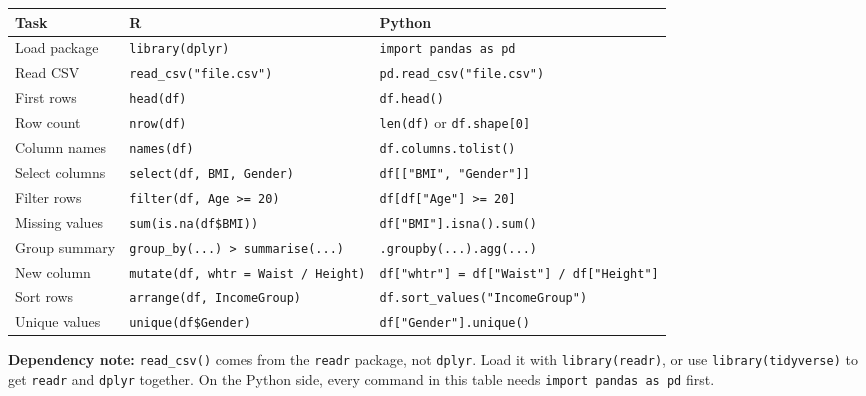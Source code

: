 \documentclass[
  letterpaper,
  DIV=11,
  numbers=noendperiod,
  oneside]{scrreprt}
\begin{document}
\begin{longtable}[]{@{}
  >{\raggedright\arraybackslash}p{}
  >{\raggedright\arraybackslash}p{}
  >{\raggedright\arraybackslash}p{}@{}}
\toprule\noalign{}
\begin{minipage}[b]{\linewidth}\raggedright
Task
\end{minipage} & \begin{minipage}[b]{\linewidth}\raggedright
R
\end{minipage} & \begin{minipage}[b]{\linewidth}\raggedright
Python
\end{minipage} \\
\midrule\noalign{}
\endhead
\bottomrule\noalign{}
\endlastfoot
Load package & \texttt{library(dplyr)} &
\texttt{import\ pandas\ as\ pd} \\
Read CSV & \texttt{read\_csv("file.csv")} &
\texttt{pd.read\_csv("file.csv")} \\
First rows & \texttt{head(df)} & \texttt{df.head()} \\
Row count & \texttt{nrow(df)} & \texttt{len(df)} or
\texttt{df.shape{[}0{]}} \\
Column names & \texttt{names(df)} & \texttt{df.columns.tolist()} \\
Select columns & \texttt{select(df,\ BMI,\ Gender)} &
\texttt{df{[}{[}"BMI",\ "Gender"{]}{]}} \\
Filter rows & \texttt{filter(df,\ Age\ \textgreater{}=\ 20)} &
\texttt{df{[}df{[}"Age"{]}\ \textgreater{}=\ 20{]}} \\
Missing values & \texttt{sum(is.na(df\$BMI))} &
\texttt{df{[}"BMI"{]}.isna().sum()} \\
Group summary &
\texttt{group\_by(...)\ \textbar{}\textgreater{}\ summarise(...)} &
\texttt{.groupby(...).agg(...)} \\
New column & \texttt{mutate(df,\ whtr\ =\ Waist\ /\ Height)} &
\texttt{df{[}"whtr"{]}\ =\ df{[}"Waist"{]}\ /\ df{[}"Height"{]}} \\
Sort rows & \texttt{arrange(df,\ IncomeGroup)} &
\texttt{df.sort\_values("IncomeGroup")} \\
Unique values & \texttt{unique(df\$Gender)} &
\texttt{df{[}"Gender"{]}.unique()} \\
\end{longtable}

\textbf{Dependency note:} \texttt{read\_csv()} comes from the
\texttt{readr} package, not \texttt{dplyr}. Load it with
\texttt{library(readr)}, or use \texttt{library(tidyverse)} to get
\texttt{readr} and \texttt{dplyr} together. On the Python side, every
command in this table needs \texttt{import\ pandas\ as\ pd} first.
\end{document}
